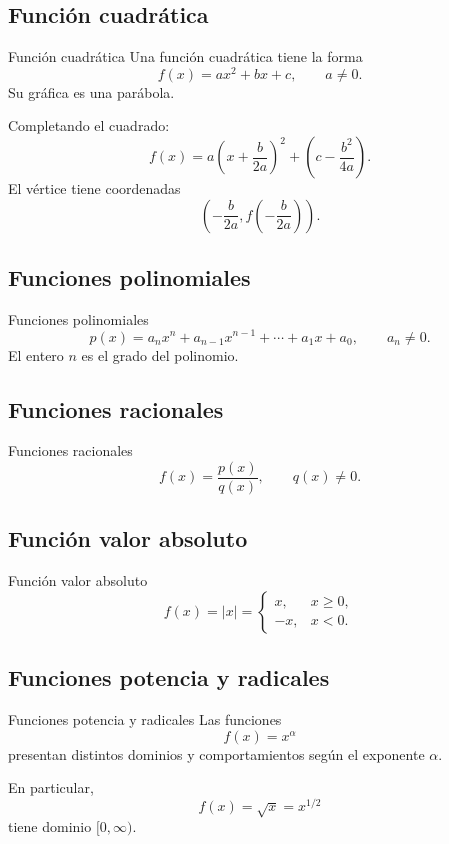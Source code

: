 \documentclass[aspectratio=169,10pt]{beamer}
\begin{document}
\subsection{Función cuadrática}
\begin{frame}{Función cuadrática}
Una función cuadrática tiene la forma
\[
f(x)=ax^2+bx+c,\qquad a\neq0.
\]
Su gráfica es una parábola.

Completando el cuadrado:
\[
f(x)
=a\left(x+\frac{b}{2a}\right)^2
+\left(c-\frac{b^2}{4a}\right).
\]
El vértice tiene coordenadas
\[
\left(
-\frac{b}{2a},
f\left(-\frac{b}{2a}\right)
\right).
\]
\end{frame}
\subsection{Funciones polinomiales}
\begin{frame}{Funciones polinomiales}
\[
p(x)=a_nx^n+a_{n-1}x^{n-1}+\cdots+a_1x+a_0,
\qquad a_n\neq0.
\]
El entero $n$ es el grado del polinomio.
\end{frame}
\subsection{Funciones racionales}
\begin{frame}{Funciones racionales}
\[
f(x)=\frac{p(x)}{q(x)},\qquad q(x)\neq0.
\]
\end{frame}
\subsection{Función valor absoluto}
\begin{frame}{Función valor absoluto}
\[
f(x)=|x|=
\begin{cases}
x,&x\geq0,\\
-x,&x<0.
\end{cases}
\]
\end{frame}
\subsection{Funciones potencia y radicales}
\begin{frame}{Funciones potencia y radicales}
Las funciones
\[
f(x)=x^\alpha
\]
presentan distintos dominios y comportamientos según el exponente $\alpha$.

En particular,
\[
f(x)=\sqrt{x}=x^{1/2}
\]
tiene dominio $[0,\infty)$.
\end{frame}
\end{document}
